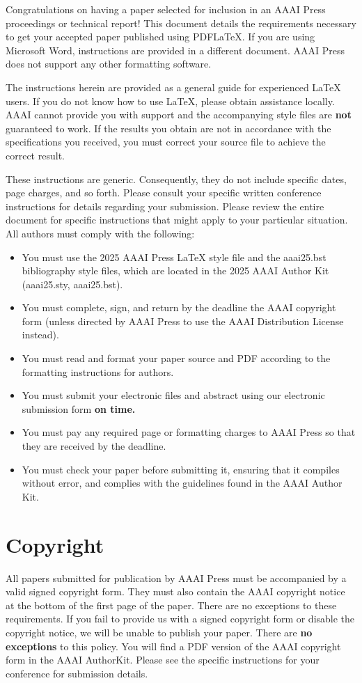 \documentclass[letterpaper]{article} %
\begin{document}
Congratulations on having a paper selected for inclusion in an AAAI Press proceedings or technical report! This document details the requirements necessary to get your accepted paper published using PDF\LaTeX{}. If you are using Microsoft Word, instructions are provided in a different document. AAAI Press does not support any other formatting software.

The instructions herein are provided as a general guide for experienced \LaTeX{} users. If you do not know how to use \LaTeX{}, please obtain assistance locally. AAAI cannot provide you with support and the accompanying style files are \textbf{not} guaranteed to work. If the results you obtain are not in accordance with the specifications you received, you must correct your source file to achieve the correct result.

These instructions are generic. Consequently, they do not include specific dates, page charges, and so forth. Please consult your specific written conference instructions for details regarding your submission. Please review the entire document for specific instructions that might apply to your particular situation. All authors must comply with the following:

\begin{itemize}
\item You must use the 2025 AAAI Press \LaTeX{} style file and the aaai25.bst bibliography style files, which are located in the 2025 AAAI Author Kit (aaai25.sty, aaai25.bst).
\item You must complete, sign, and return by the deadline the AAAI copyright form (unless directed by AAAI Press to use the AAAI Distribution License instead).
\item You must read and format your paper source and PDF according to the formatting instructions for authors.
\item You must submit your electronic files and abstract using our electronic submission form \textbf{on time.}
\item You must pay any required page or formatting charges to AAAI Press so that they are received by the deadline.
\item You must check your paper before submitting it, ensuring that it compiles without error, and complies with the guidelines found in the AAAI Author Kit.
\end{itemize}

\section{Copyright}
All papers submitted for publication by AAAI Press must be accompanied by a valid signed copyright form. They must also contain the AAAI copyright notice at the bottom of the first page of the paper. There are no exceptions to these requirements. If you fail to provide us with a signed copyright form or disable the copyright notice, we will be unable to publish your paper. There are \textbf{no exceptions} to this policy. You will find a PDF version of the AAAI copyright form in the AAAI AuthorKit. Please see the specific instructions for your conference for submission details.
\end{document}

